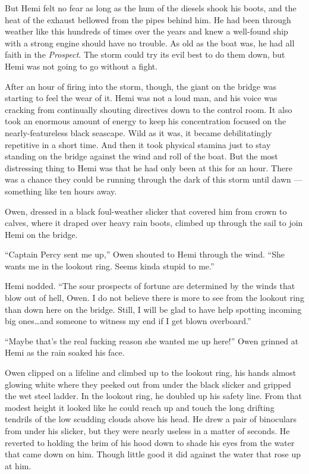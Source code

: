 \documentclass[
]{scrbook}
\begin{document}
But Hemi felt no fear as long as the hum of the diesels shook his boots,
and the heat of the exhaust bellowed from the pipes behind him. He had
been through weather like this hundreds of times over the years and knew
a well-found ship with a strong engine should have no trouble. As old as
the boat was, he had all faith in the \emph{Prospect}. The storm could
try its evil best to do them down, but Hemi was not going to go without
a fight.

After an hour of firing into the storm, though, the giant on the bridge
was starting to feel the wear of it. Hemi was not a loud man, and his
voice was cracking from continually shouting directives down to the
control room. It also took an enormous amount of energy to keep his
concentration focused on the nearly-featureless black seascape. Wild as
it was, it became debilitatingly repetitive in a short time. And then it
took physical stamina just to stay standing on the bridge against the
wind and roll of the boat. But the most distressing thing to Hemi was
that he had only been at this for an hour. There was a chance they could
be running through the dark of this storm until dawn --- something like
ten hours away.

Owen, dressed in a black foul-weather slicker that covered him from
crown to calves, where it draped over heavy rain boots, climbed up
through the sail to join Hemi on the bridge.

``Captain Percy sent me up,'' Owen shouted to Hemi through the wind.
``She wants me in the lookout ring. Seems kinda stupid to me.''

Hemi nodded. ``The sour prospects of fortune are determined by the winds
that blow out of hell, Owen. I do not believe there is more to see from
the lookout ring than down here on the bridge. Still, I will be glad to
have help spotting incoming big ones\ldots and someone to witness my end
if I get blown overboard.''

``Maybe that's the real fucking reason she wanted me up here!'' Owen
grinned at Hemi as the rain soaked his face.

Owen clipped on a lifeline and climbed up to the lookout ring, his hands
almost glowing white where they peeked out from under the black slicker
and gripped the wet steel ladder. In the lookout ring, he doubled up his
safety line. From that modest height it looked like he could reach up
and touch the long drifting tendrils of the low scudding clouds above
his head. He drew a pair of binoculars from under his slicker, but they
were nearly useless in a matter of seconds. He reverted to holding the
brim of his hood down to shade his eyes from the water that came down on
him. Though little good it did against the water that rose up at him.
\end{document}
